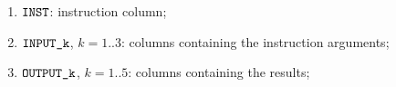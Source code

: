 \begin{enumerate}
\item
	\godGiven{}
	$\texttt{INST}{}$:
	instruction column;
    \item
	\godGiven{}
	$\texttt{INPUT\_k}$, $k=1..3$:
	columns containing the instruction arguments;
    \item
	\markAsJustifiedHere{}
	$\texttt{OUTPUT\_k}$, $k=1..5$:
	columns containing the results;
\end{enumerate}
